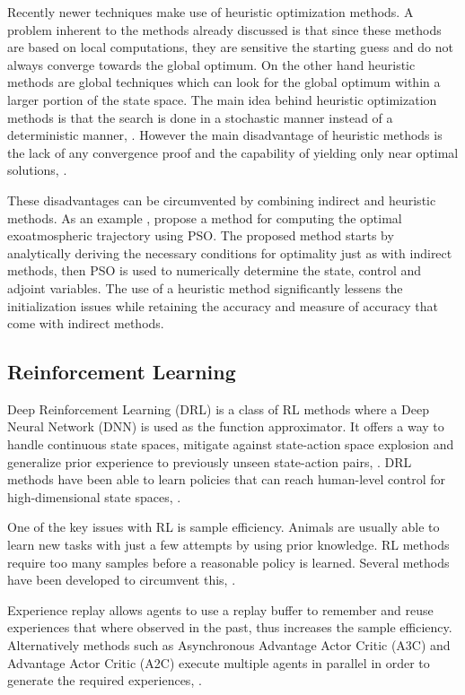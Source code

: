 \documentclass[12pt, english, NoHyper]{AE4010-template}
\begin{document}
Recently newer techniques make use of heuristic optimization methods. A problem inherent to the methods already discussed is that since these methods are based on local computations, they are sensitive the starting guess and do not always converge towards the global optimum. On the other hand heuristic methods are global techniques which can look for the global optimum within a larger portion of the state space. The main idea behind heuristic optimization methods is that the search is done in a stochastic manner instead of a deterministic manner, \cite{rao2009survey}. However the main disadvantage of heuristic methods is the lack of any convergence proof and the capability of yielding only near optimal solutions, \cite{pontani2014optimal}.

These disadvantages can be circumvented by combining indirect and heuristic methods. As an example \cite{PONTANI2014852, pontani2013ascent, pontani2014simple, pontani2014optimal}, propose a method for computing the optimal exoatmospheric trajectory using PSO. The proposed method starts by analytically deriving the necessary conditions for optimality just as with indirect methods, then PSO is used to numerically determine the state, control and adjoint variables. The use of a heuristic method significantly lessens the initialization issues while retaining the accuracy and measure of accuracy that come with indirect methods.

\subsection{Reinforcement Learning}
Deep Reinforcement Learning (DRL) is a class of RL methods where a Deep Neural Network (DNN) is used as the function approximator. It offers a way to handle continuous state spaces, mitigate against state-action space explosion and generalize prior experience to previously unseen state-action pairs, \cite{kiran2021deep}. DRL methods have been able to learn policies that can reach human-level control for high-dimensional state spaces, \cite{mnih2015human, silver2016mastering}. 

One of the key issues with RL is sample efficiency. Animals are usually able to learn new tasks with just a few attempts by using prior knowledge. RL methods require too many samples before a reasonable policy is learned. Several methods have been developed to circumvent this, \cite{kiran2021deep}.

Experience replay allows agents to use a replay buffer to remember and reuse experiences that where observed in the past, thus increases the sample efficiency. Alternatively methods such as Asynchronous Advantage Actor Critic (A3C) and Advantage Actor Critic (A2C) execute multiple agents in parallel in order to generate the required experiences, \cite{mnih2016asynchronous}. 
\end{document}
